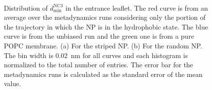 \begin{figure}[ht!]
	\center
	\\%
	\caption{Distribution of $d_\text{min}^{\text{NC}3}$ in the entrance leaflet. The red curve is from an average over the metadynamics runs considering only the portion of the trajectory in which the \acs{NP} is in the hydrophobic state. The blue curve is from the unbiased run and the green one is from a pure \acs{POPC} membrane. (a) For the striped \acs{NP}. (b) For the random \acs{NP}. The bin width is $0.02$~nm for all curves and each histogram is normalized to the total number of entries. The error bar for the metadynamics runs is calculated as the standard error of the mean value.}%
	\label{fig:NC3minDistUn}
\end{figure}
